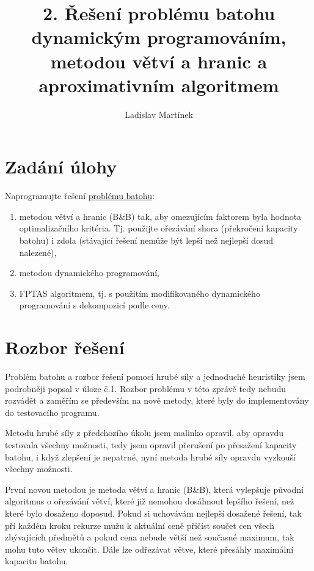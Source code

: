 \documentclass[11pt]{article}
\begin{document}

\title{2. Řešení problému batohu dynamickým programováním, metodou větví a hranic a aproximativním algoritmem}
\author{Ladislav Martínek}
\date{}
\maketitle
 
\section{Zadání úlohy} 



Naprogramujte řešení \href{http://www.csc.kth.se/~viggo/wwwcompendium/node211.html#7374}{problému batohu}:
\begin{enumerate}
\item metodou větví a hranic (B\&B) tak, aby omezujícím faktorem byla hodnota optimalizačního kritéria. Tj. použijte ořezávání shora (překročení kapacity batohu) i zdola (stávající řešení nemůže být lepší než nejlepší dosud nalezené),
\item metodou dynamického programování,
\item FPTAS algoritmem, tj. s použitím modifikovaného dynamického programování s dekompozicí podle ceny.
\end{enumerate}

\section{Rozbor řešení}\label{kap:1}

Problém batohu a rozbor řešení pomocí hrubé síly a jednoduché heuristiky jsem podrobněji popsal v úloze č.1. Rozbor problému v této zprávě tedy nebudu rozvádět a zaměřím se především na nově metody, které byly do implementovány do testovacího programu.

Metodu hrubé síly z předchozího úkolu jsem malinko opravil, aby opravdu testovala všechny možnosti, tedy jsem opravil přerušení po přesažení kapacity batohu, i když zlepšení je nepatrné, nyní metoda hrubé síly opravdu vyzkouší všechny možnosti.

První novou metodou je metoda větví a hranic (B\&B), která vylepšuje původní algoritmus o ořezávání větví, které již nemohou dosáhnout lepšího řešení, než které bylo dosaženo doposud. Pokud si uchovávám nejlepší dosažené řešení, tak při každém kroku rekurze mužu k aktuální ceně přičíst součet cen všech zbývajících předmětů a pokud cena nebude větší než současné maximum, tak mohu tuto větev ukončit. Dále lze odřezávat větve, které přesáhly maximální kapacitu batohu.
\end{document}
